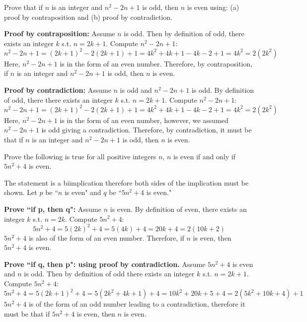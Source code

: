 \documentclass[11pt,addpoints]{exam}
\begin{document}
\begin{questions}
\question[16]  Prove that if $n$ is an integer and $n^2 - 2n + 1$ is odd,
then $n$ is even using: (a) proof by contraposition and (b) proof by
contradiction.
    \ifprintanswers
        \vspace{-10pt}
    \fi
\begin{solution} \textbf{Proof by contraposition:}
    Assume $n$ is odd.  Then by definition of odd, there exists an
    integer $k$ s.t. $n=2k+1$.  Compute $n^2 - 2n + 1$:
    \[ n^2 - 2n + 1 = (2k+1)^2 - 2(2k+1) + 1 = 4k^2 + 4k + 1 - 4k - 2 + 1 = 4k^2 = 2(2k^2) \]
    Here, $n^2 - 2n + 1$ is in the form of an even number.  Therefore, by
    contraposition, if $n$ is an integer and $n^2 - 2n + 1$ is odd,
    then $n$ is even.

    \medskip
    \textbf{Proof by contradiction:} Assume $n$ is odd and $n^2 - 2n + 1$ is
    odd.  By definition of odd, there there exists an
    integer $k$ s.t. $n=2k+1$.  Compute $n^2 - 2n + 1$:
    \[ n^2 - 2n + 1 = (2k+1)^2 - 2(2k+ 1) + 1 = 4k^2 + 4k+ 1 - 4k - 2 + 1 = 4k^2 = 2(2k^2) \]
    Here, $n^2 - 2n + 1$ is in the form of an even number, however, we assumed
    $n^2 -2n +1$ is odd giving a contradiction. Therefore, by
    contradiction, it must be that if $n$ is an integer and $n^2 - 2n + 1$ is
    odd, then $n$ is even.
\end{solution}


\question[16] Prove the following is true for all positive integers $n$, $n$ is even if and only if $5n^2 + 4$ is even.
    \ifprintanswers
        \vspace{-10pt}
    \fi
\begin{solution}
    The statement is a biimplication therefore both sides of the
    implication must be shown.  Let $p$ be ``$n$ is even" and $q$ be
    ``$5n^2 + 4$ is even."
    
    \textbf{Prove ``if p, then q":}
    Assume $n$ is even. By definition of even, there exists an
    integer $k$ s.t. $n=2k$.  Compute $5n^2+4$:
    \[ 5n^2 + 4 = 5(2k)^2 + 4 = 5(4k) + 4 = 20k + 4 = 2(10k+2) \]
    $5n^2+4$ is also of the form of an even number.  Therefore, if $n$
    is even, then $5n^2+4$ is even.

    \smallskip
    \textbf{Prove ``if q, then p": using proof by contradiction.}
    Assume $5n^2+4$ is even and $n$ is odd.  Then by definition of odd
    there exists an integer $k$ s.t. $n=2k+1$.  Compute $5n^2+4$:
    \[ 5n^2+4 = 5(2k+1)^2+4 = 5(2k^2+4k+1)+4 = 10k^2 + 20k + 5 + 4 = 2(5k^2 + 10k + 4) + 1 \]
    $5n^2+4$ is of the form of an odd number leading to a
    contradiction, therefore it must be that if $5n^2+4$ is even, then
    $n$ is even.


\end{solution}
\end{questions}
\end{document}

